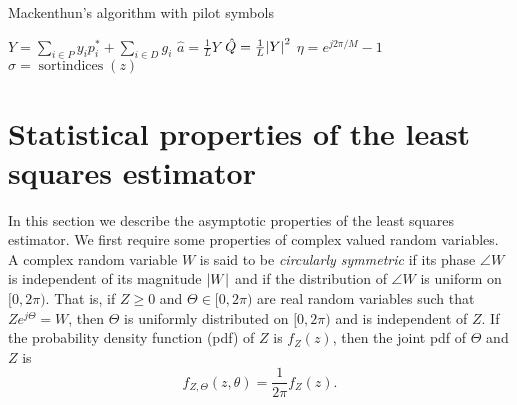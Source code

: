 \documentclass[journal]{IEEEtran}
\begin{document}
\begin{algorithm}[t] \label{alg:loglinear}
\SetAlCapFnt{\small}
\SetAlTitleFnt{}
\caption{Mackenthun's algorithm with pilot symbols}
\DontPrintSemicolon
{}
$Y = \sum_{i \in P} y_i p_i^* + \sum_{i \in D} g_i $ \;
$\hat{a} = \frac{1}{L} Y$  \;
$\hat{Q} = \frac{1}{L}{\left\vert Y \right\vert}^2$  \;
$\eta = e^{j2\pi/M} - 1$ \;
$\sigma = \operatorname{sortindices}(z)$  \;
\end{algorithm}

\section{Statistical properties of the least squares estimator}\label{sec:stat-prop-least}

In this section we describe the asymptotic properties of the least squares estimator.  We first require some properties of complex valued random variables.  A complex random variable $W$ is said to be \emph{circularly symmetric} if its phase $\angle{W}$ is independent of its magnitude ${\left\vert W \right\vert}$ and if the distribution of $\angle{W}$ is uniform on $[0,2\pi)$.  That is, if $Z \geq 0$ and $\Theta \in [0,2\pi)$ are real random variables such that $Ze^{j\Theta} = W$, then $\Theta$ is uniformly distributed on $[0,2\pi)$ and is independent of $Z$.  If the probability density function (pdf) of $Z$ is $f_Z(z)$, then the joint pdf of $\Theta$ and $Z$ is 
\[
f_{Z,\Theta}(z,\theta) = \frac{1}{2\pi}f_Z(z).
\]
\end{document}
